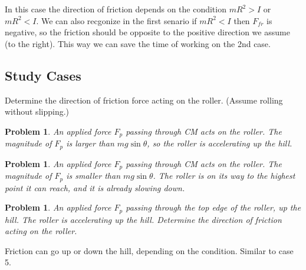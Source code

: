 \documentclass{article}
\newtheorem{problem}[theorem]{Problem}
\begin{document}
In this case the direction of friction depends on the condition $mR^{2}>I$
or $mR^{2}<I$. We can also recgonize in the first senario if $mR^{2}<I$ then 
$F_{fr}$ is negative, so the friction should be opposite to the positive
direction we assume (to the right). This way we can save the time of working
on the 2nd case.

\bigskip

\newpage

\subsection{Study Cases}

Determine the direction of friction force acting on the roller. (Assume
rolling without slipping.)

\begin{problem}
An applied force $F_{p}$ passing through CM acts on the roller. The
magnitude of $F_{p}$ is larger than $mg\sin \theta $, so the roller is
accelerating up the hill.
\end{problem}





\newpage

\begin{problem}
An applied force $F_{p}$ passing through CM acts on the roller. The
magnitude of $F_{p}$ is smaller than $mg\sin \theta $. The roller is on its
way to the highest point it can reach, and it is already slowing down.
\end{problem}





\newpage

\begin{problem}
An applied force $F_{p}$ passing through the top edge of the roller, up the
hill. The roller is accelerating up the hill. Determine the direction of
friction acting on the roller.
\end{problem}



\bigskip

Friction can go up or down the hill, depending on the condition. Similar to
case 5.


\end{document}
